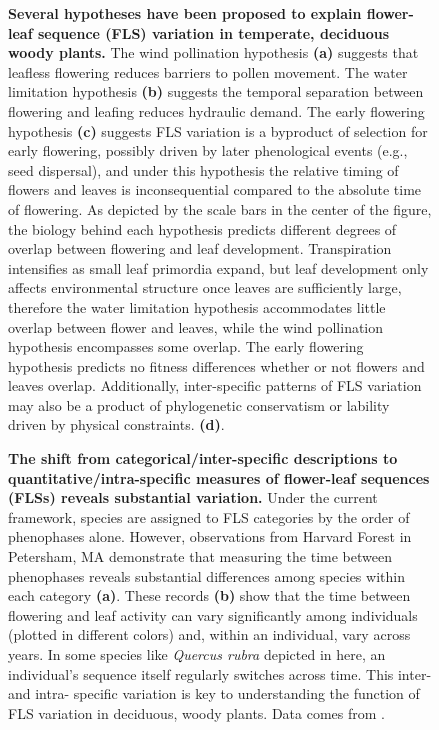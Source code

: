 \documentclass[11pt]{article}
\begin{document}
\begin{figure}[h!]
    \centering
    \caption{\textbf{Several hypotheses have been proposed to explain flower-leaf sequence (FLS) variation in temperate, deciduous woody plants.}  The wind pollination hypothesis \textbf{(a)} suggests that leafless flowering reduces barriers to pollen movement. The water limitation hypothesis \textbf{(b)} suggests the temporal separation between flowering and leafing reduces hydraulic demand. The early flowering hypothesis \textbf{(c)} suggests FLS variation is a byproduct of selection for early flowering, possibly driven by later phenological events (e.g., seed dispersal), and under this hypothesis the relative timing of flowers and leaves is inconsequential compared to the absolute time of flowering. As depicted by the scale bars in the center of the figure, the biology behind each hypothesis predicts different degrees of overlap between flowering and leaf development. Transpiration intensifies as small leaf primordia expand, but leaf development only affects environmental structure once leaves are sufficiently large, therefore the water limitation hypothesis accommodates little overlap between flower and leaves, while the wind pollination hypothesis encompasses some overlap. The early flowering hypothesis predicts no fitness differences whether or not flowers and leaves overlap. Additionally, inter-specific patterns of FLS variation may also be a product of phylogenetic conservatism or lability driven by physical constraints. \textbf{(d)}.}
    \label{fig:conceptual}
\end{figure}
  
 \begin{figure}[h!]
        \centering
          \caption{\textbf{The shift from categorical/inter-specific descriptions to quantitative/intra-specific measures of flower-leaf sequences (FLSs) reveals substantial variation.} Under the current framework, species are assigned to FLS categories by the order of phenophases alone. However, observations from Harvard Forest in Petersham, MA demonstrate that measuring the time between phenophases reveals substantial differences among species within each category \textbf{(a)}. These records \textbf{(b)} show that the time between flowering and leaf activity can vary significantly among individuals (plotted in different colors) and, within an individual, vary across years. In some species like \emph{Quercus rubra} depicted in here, an individual's sequence itself regularly switches across time. This inter- and intra- specific variation is key to understanding the function of FLS variation in deciduous, woody plants. Data comes from \citet{OKeefe2015}.}
        \label{fig:vizzy}
    \end{figure}
\end{document}
